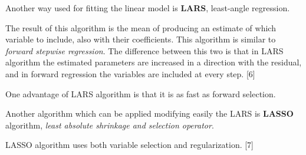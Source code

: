 Another way used for fitting the linear model is \textbf{LARS}, least-angle regression. 

The result of this algorithm is the mean of producing an estimate of which variable to include, also with their coefficients. This algorithm is similar to \textit{forward stepwise regression}. The difference between this two is that in LARS algorithm the estimated parameters are increased in a direction with the residual, and in forward regression the variables are included at every step. [6]

One advantage of LARS algorithm is that it is as fast as forward selection.

Another algorithm which can be applied modifying easily the LARS is \textbf{LASSO} algorithm, \textit{least absolute shrinkage and selection operator}. 

LASSO algorithm uses both variable selection and regularization. [7]